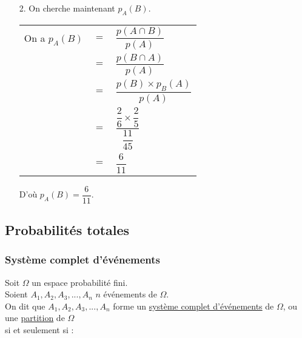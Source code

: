 \begin{itemize}
\vspace*{.3cm}

\item[2.] On cherche maintenant $p_A\left(B\right)$. \\

\begin{tabular}{lll}
\hspace*{-.3cm} On a $p_A\left(B\right)$ & $=$ & $\dfrac{p\left(A \cap B\right)}{p\left(A\right)}$ \vspace*{.3cm} \\
& $=$ & $\dfrac{p\left(B \cap A\right)}{p\left(A\right)}$ \vspace*{.3cm} \\
& $=$ & $\dfrac{p\left(B\right) \times p_B\left(A\right)}{p\left(A\right)}$ \vspace*{.3cm} \\
& $=$ & $\dfrac{\dfrac{2}{6} \times \dfrac{2}{5}}{\dfrac{11}{45}}$ \vspace*{.3cm} \\
& $=$ & $\dfrac{6}{11}$ \\
\end{tabular}

\vspace*{.3cm}

D'où $p_A\left(B\right) = \dfrac{6}{11}$.

\vspace*{-20cm}
\end{itemize}

\vspace*{-20cm}

\newpage

\vspace*{-1.5cm}

\subsection{Probabilités totales}

\subsubsection{Système complet d'événements}

Soit $\Omega$ un espace probabilité fini. \\
Soient $A_1, A_2, A_3, ..., A_n$ $n$ événements de $\Omega$. \\

On dit que $A_1, A_2, A_3, ..., A_n$ forme un \underline{système complet d'événements} de $\Omega$, ou une \underline{partition} de $\Omega$ \\ si et seulement si : \\

